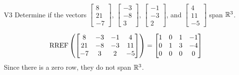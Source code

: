 \begin{problem}{V3}
Determine if the vectors  \(\begin{bmatrix} 8 \\ 21 \\ -7 \end{bmatrix}\), \(\begin{bmatrix} -3 \\ -8 \\ 3 \end{bmatrix}\), \(\begin{bmatrix} -1 \\ -3 \\ 2 \end{bmatrix}\), and \(\begin{bmatrix} 4 \\ 11 \\ -5 \end{bmatrix}\) span \(\mathbb{R}^3\).
\end{problem}
\begin{solution}
\[\operatorname{RREF}\left(\begin{bmatrix} 8 & -3 & -1 & 4 \\ 21 & -8 & -3 & 11 \\ -7 & 3 & 2 & -5  \end{bmatrix} \right) = \begin{bmatrix} 1 & 0 & 1 & -1 \\ 0 & 1 & 3 & -4 \\ 0 & 0 & 0 & 0\end{bmatrix}\]
Since there is a zero row, they do not span \(\mathbb{R}^3\).
\end{solution}

